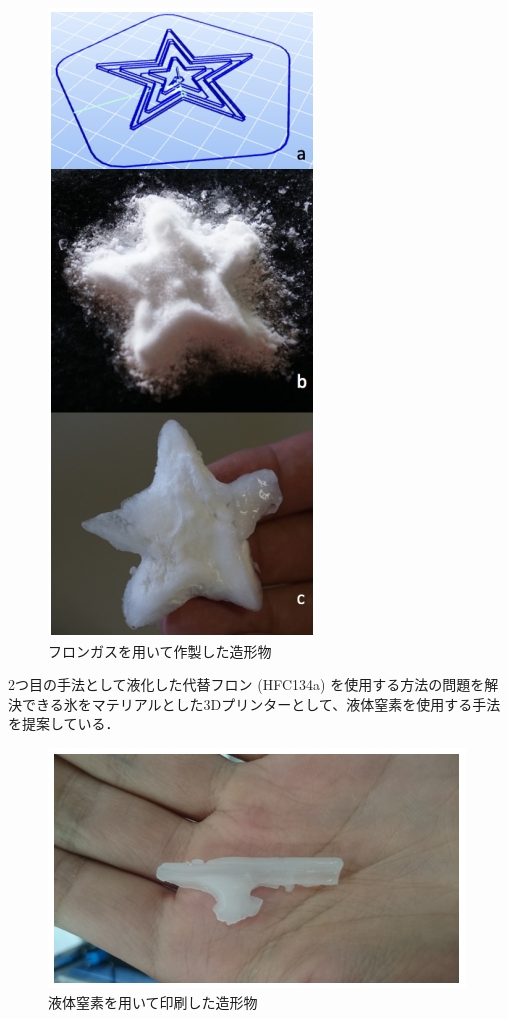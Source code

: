 \begin{figure}[H]
  \centering
  \includegraphics[width=6truecm]{./fig/erusa1.jpg}
  \caption{フロンガスを用いて作製した造形物}
  \label{fig:ferret}
\end{figure}

2つ目の手法として液化した代替フロン (HFC134a) を使用する方法の問題を解決できる氷をマテリアルとした3Dプリンターとして、液体窒素を使用する手法を提案している．

\begin{figure}[H]
  \centering
  \includegraphics[width=10truecm]{./fig/erusa2.jpg}
  \caption{液体窒素を用いて印刷した造形物}
  \label{fig:ferret}
\end{figure}




